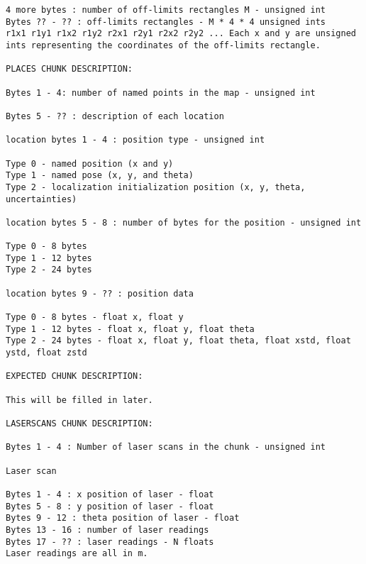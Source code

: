\documentclass{article}
\begin{document}
\begin{verbatim}
4 more bytes : number of off-limits rectangles M - unsigned int
Bytes ?? - ?? : off-limits rectangles - M * 4 * 4 unsigned ints
r1x1 r1y1 r1x2 r1y2 r2x1 r2y1 r2x2 r2y2 ... Each x and y are unsigned
ints representing the coordinates of the off-limits rectangle.

PLACES CHUNK DESCRIPTION:

Bytes 1 - 4: number of named points in the map - unsigned int

Bytes 5 - ?? : description of each location

location bytes 1 - 4 : position type - unsigned int

Type 0 - named position (x and y)
Type 1 - named pose (x, y, and theta)
Type 2 - localization initialization position (x, y, theta,
uncertainties)

location bytes 5 - 8 : number of bytes for the position - unsigned int

Type 0 - 8 bytes
Type 1 - 12 bytes
Type 2 - 24 bytes

location bytes 9 - ?? : position data

Type 0 - 8 bytes - float x, float y
Type 1 - 12 bytes - float x, float y, float theta
Type 2 - 24 bytes - float x, float y, float theta, float xstd, float
ystd, float zstd

EXPECTED CHUNK DESCRIPTION:

This will be filled in later.

LASERSCANS CHUNK DESCRIPTION:

Bytes 1 - 4 : Number of laser scans in the chunk - unsigned int

Laser scan

Bytes 1 - 4 : x position of laser - float
Bytes 5 - 8 : y position of laser - float
Bytes 9 - 12 : theta position of laser - float
Bytes 13 - 16 : number of laser readings
Bytes 17 - ?? : laser readings - N floats    
Laser readings are all in m.
\end{verbatim}
\end{document}
